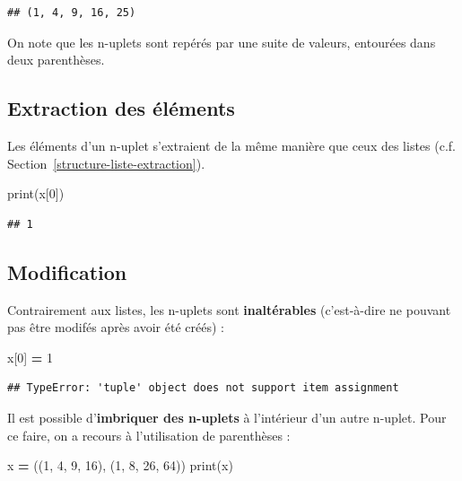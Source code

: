 \documentclass[
  12pt,
]{book}
\newenvironment{Shaded}{\begin{snugshade}}{\end{snugshade}}
\newcommand{\BuiltInTok}[1]{#1}
\newcommand{\DecValTok}[1]{\textcolor[rgb]{0.00,0.00,0.81}{#1}}
\newcommand{\NormalTok}[1]{#1}
\newcommand{\OperatorTok}[1]{\textcolor[rgb]{0.81,0.36,0.00}{\textbf{#1}}}
\numberwithin{equation}{section}
\numberwithin{countremarque}{section}
\begin{document}
\begin{lstlisting}
## (1, 4, 9, 16, 25)
\end{lstlisting}

On note que les n-uplets sont repérés par une suite de valeurs, entourées dans deux parenthèses.

\subsection{Extraction des éléments}\label{extraction-des-uxe9luxe9ments}

Les éléments d'un n-uplet s'extraient de la même manière que ceux des listes (c.f. Section~\ref{structure-liste-extraction}).

\begin{Shaded}
\begin{Highlighting}[]
\BuiltInTok{print}\NormalTok{(x[}\DecValTok{0}\NormalTok{])}
\end{Highlighting}
\end{Shaded}

\begin{lstlisting}
## 1
\end{lstlisting}

\subsection{Modification}\label{modification-1}

Contrairement aux listes, les n-uplets sont \textbf{inaltérables} (c'est-à-dire ne pouvant pas être modifés après avoir été créés) :

\begin{Shaded}
\begin{Highlighting}[]
\NormalTok{x[}\DecValTok{0}\NormalTok{] }\OperatorTok{=} \DecValTok{1}
\end{Highlighting}
\end{Shaded}

\begin{lstlisting}
## TypeError: 'tuple' object does not support item assignment
\end{lstlisting}

Il est possible d'\textbf{imbriquer des n-uplets} à l'intérieur d'un autre n-uplet. Pour ce faire, on a recours à l'utilisation de parenthèses :

\begin{Shaded}
\begin{Highlighting}[]
\NormalTok{x }\OperatorTok{=}\NormalTok{ ((}\DecValTok{1}\NormalTok{, }\DecValTok{4}\NormalTok{, }\DecValTok{9}\NormalTok{, }\DecValTok{16}\NormalTok{), (}\DecValTok{1}\NormalTok{, }\DecValTok{8}\NormalTok{, }\DecValTok{26}\NormalTok{, }\DecValTok{64}\NormalTok{))}
\BuiltInTok{print}\NormalTok{(x)}
\end{Highlighting}
\end{Shaded}
\end{document}
